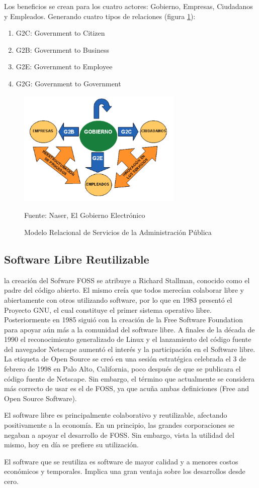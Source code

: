 Los beneficios se crean para los cuatro actores: Gobierno, Empresas, Ciudadanos y Empleados. Generando cuatro tipos de relaciones (figura \ref{fig:g2all}):

\begin{enumerate}
    \item G2C: Government to Citizen
    \item G2B: Government to Business
    \item G2E: Government to Employee
    \item G2G: Government to Government
\end{enumerate}

\begin{figure}[!h]
    \centering
    \includegraphics[width=0.7\textwidth]{assets/g2all}
    \caption{Modelo Relacional de Servicios de la Administración Pública}{Fuente: Naser, El Gobierno Electrónico}
    \label{fig:g2all}
\end{figure}

\subsection{Software Libre Reutilizable}

la creación del Sofware FOSS se atribuye a Richard Stallman, conocido como el padre del código abierto. El mismo creía que todos merecían colaborar libre y abiertamente con otros utilizando software, por lo que en 1983 presentó el Proyecto GNU, el cual constituye el primer sistema operativo libre. Posteriormente en 1985 siguió con la creación de la Free Software Foundation para apoyar aún más a la comunidad del software libre. A finales de la década de 1990 el reconocimiento generalizado de Linux y el lanzamiento del código fuente del navegador Netscape aumentó el interés y la participación en el Software libre. La etiqueta de Open Source se creó en una sesión estratégica celebrada el 3 de febrero de 1998 en Palo Alto, California, poco después de que se publicara el código fuente de Netscape. Sin embargo, el término que actualmente se considera más correcto de usar es el de FOSS, ya que acuña ambas definiciones (Free and Open Source Software). 

El software libre es principalmente colaborativo y reutilizable, afectando positivamente a la economía. En un principio, las grandes corporaciones se negaban a apoyar el desarrollo de FOSS. Sin embargo, vista la utilidad del mismo, hoy en día se prefiere su utilización.

El software que se reutiliza es software de mayor calidad y a menores costos económicos y temporales. Implica una gran ventaja sobre los desarrollos desde cero.